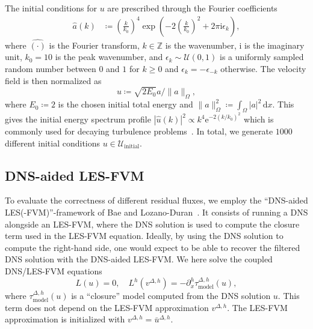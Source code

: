 \documentclass[preprint,twocolumn,5p]{elsarticle}
\begin{document}
The initial conditions for $u$ are prescribed through the Fourier coefficients
\begin{equation}
\begin{split}
    \hat{a}(k) & \coloneq \left(\frac{k}{k_0}\right)^4
    \exp\left(-2 \left(\frac{k}{k_0}\right)^2 + 2 \pi \mathrm{i} \epsilon_k \right),
\end{split}
\end{equation}
where $\widehat{(\cdot)}$ is the Fourier transform,
$k \in \mathbb{Z}$ is the wavenumber,
$\mathrm{i}$ is the imaginary unit,
$k_0 = 10$ is the peak wavenumber,
and $\epsilon_k \sim \mathcal{U}(0, 1)$
is a uniformly sampled random number between $0$ and $1$ for $k \geq 0$ and
$\epsilon_{k} = -\epsilon_{-k}$ otherwise.
The velocity field is then normalized as
\begin{equation}
    u \coloneq \sqrt{2 E_0} a / \| a \|_\Omega,
\end{equation}
where $E_0 \coloneq 2$ is the chosen initial total energy and
$\| a \|^2_\Omega \coloneq \int_\Omega |a|^2 \, \mathrm{d} x$.
This gives the initial energy spectrum profile
$|\hat{u}(k)|^2 \propto k^4 \mathrm{e}^{-2 (k / k_0)^2}$
which is commonly used for decaying turbulence
problems~\cite{
sanHighorderMethodsDecaying2012,
maulikExplicitImplicitClosures2018,
verstappenMergingFilteringModeling2025}.
In total, we generate $1000$ different initial conditions
$u \in \mathcal{U}_\text{initial}$.

\subsection{DNS-aided LES-FVM}
\label{sec:burgers-dns-aid}

To evaluate the correctness of different residual fluxes, we employ
the ``DNS-aided LES(-FVM)''-framework of Bae and
Lozano-Duran~\cite{baeExactSubgridscaleModels2017,baeNumericalModelingError2022}.
It consists of running a DNS alongside an LES-FVM, where the DNS solution is
used to compute the closure term used in the LES-FVM equation. Ideally, by
using the DNS solution to compute the right-hand side, one would expect to be
able to recover the filtered DNS solution with the DNS-aided LES-FVM.
We here solve the coupled DNS/LES-FVM equations
\begin{equation}
    L(u) = 0, \quad
    L^h(v^{\Delta, h}) = -\partial^h_x \tau^{\Delta, h}_\text{model}(u),
\end{equation}
where $\tau^{\Delta, h}_\text{model}(u)$ is a ``closure'' model
computed from the DNS solution $u$.
This term does not depend on the LES-FVM approximation $v^{\Delta, h}$.
The LES-FVM approximation is initialized with
$v^{\Delta, h} = \bar{u}^{\Delta, h}$.
\end{document}
